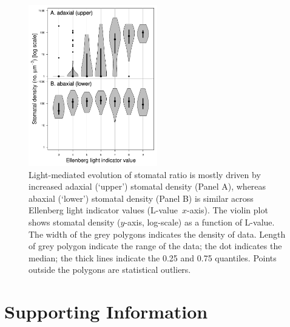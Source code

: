 \documentclass[12pt, oneside]{article}
\newcommand{\el}{L-value}
\begin{document}
\begin{figure}[ht]
\centerline{\includegraphics[width=0.5\textwidth]{figures/figure_SD-light.pdf}}
\caption{Light-mediated evolution of stomatal ratio is mostly driven by increased adaxial (`upper') stomatal density (Panel A), whereas abaxial (`lower') stomatal density (Panel B) is similar across Ellenberg light indicator values (\el~$x$-axis). The violin plot shows stomatal density ($y$-axis, log-scale) as a function of \el. The width of the grey polygons indicates the density of data. Length of grey polygon indicate the range of the data; the dot indicates the median; the thick lines indicate the 0.25 and 0.75 quantiles. Points outside the polygons are statistical outliers.} 
\label{fig:SD-light}
\end{figure}

\clearpage


\section*{Supporting Information}

\renewcommand\thefigure{S\arabic{figure}}    
\renewcommand\thetable{S\arabic{table}}    
\renewcommand\theequation{S\arabic{equation}}    
\setcounter{table}{0}    
\setcounter{equation}{0}
\setcounter{figure}{0}

\end{document}
